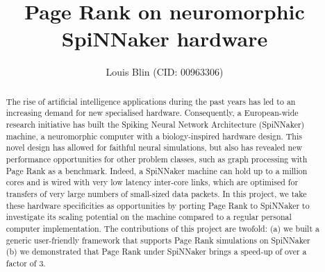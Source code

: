 \documentclass[12pt, twoside]{article}
\title{Page Rank on neuromorphic \\SpiNNaker hardware}
\author{Louis Blin (CID: 00963306)}
\begin{document}


\newpage
\begin{abstract}

The rise of artificial intelligence applications during the past years has led to an increasing demand for new specialised hardware. Consequently, a European-wide research initiative has built the Spiking Neural Network Architecture (SpiNNaker) machine, a neuromorphic computer with a biology-inspired hardware design. This novel design has allowed for faithful neural simulations, but also has revealed new performance opportunities for other problem classes, such as graph processing with Page Rank as a benchmark. Indeed, a SpiNNaker machine can hold up to a million cores and is wired with very low latency inter-core links, which are optimised for transfers of very large numbers of small-sized data packets. In this project, we take these hardware specificities as opportunities by porting Page Rank to SpiNNaker to investigate its scaling potential on the machine compared to a regular personal computer implementation. The contributions of this project are twofold: (a) we built a generic user-friendly framework that supports Page Rank simulations on SpiNNaker (b) we demonstrated that Page Rank under SpiNNaker brings a speed-up of over a factor of 3.


\end{abstract}
\end{document}
